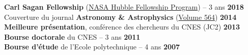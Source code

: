\documentclass[11pt, a4paper, french]{article}
\begin{document}
\textbf{Carl Sagan Fellowship} (\href{http://www.stsci.edu/stsci-research/fellowships/nasa-hubble-fellowship-program}{NASA Hubble Fellowship Program}) -- 3 ans \hfill   { \bf 2018}\\

\vspace{-0.15cm}
Couverture du journal \textbf{Astronomy \& Astrophysics} (\href{https://www.aanda.org/articles/aa/abs/2014/04/contents/contents.html}{Volume 564}) \hfill  { \bf 2014}\\

\vspace{-0.15cm}
\textbf{Meilleure présentation}, conférence des chercheurs du CNES (JC2) \hfill   { \bf 2013}\\

\vspace{-0.15cm}
\textbf{Bourse doctorale} du CNES -- 3 ans \hfill   { \bf 2011}\\

\vspace{-0.15cm}
\textbf{Bourse d'étude} de l'Ecole polytechnique -- 4 ans \hfill   { \bf 2007}\\

\end{document}
